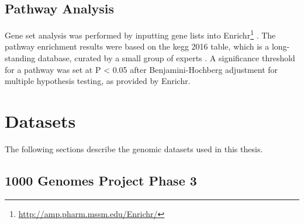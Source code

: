 \documentclass[twoside,openright]{report}
\newenvironment{Shaded}{\begin{snugshade}}{\end{snugshade}}
\newcommand{\KeywordTok}[1]{\textcolor[rgb]{0.13,0.29,0.53}{\textbf{#1}}}
\newcommand{\CommentTok}[1]{\textcolor[rgb]{0.56,0.35,0.01}{\textit{#1}}}
\newcommand{\FunctionTok}[1]{\textcolor[rgb]{0.00,0.00,0.00}{#1}}
\newcommand{\VariableTok}[1]{\textcolor[rgb]{0.00,0.00,0.00}{#1}}
\newcommand{\ExtensionTok}[1]{#1}
\newcommand{\NormalTok}[1]{#1}
\begin{document}
\begin{Shaded}
\end{Shaded}

\subsection{Pathway Analysis}\label{pathway-analysis-1}

Gene set analysis was performed by inputting gene lists into
Enrichr\footnote{\url{http://amp.pharm.mssm.edu/Enrichr/}}
\citep{Chen2013b, Kuleshov2016}. The pathway enrichment results were
based on the \gls{kegg} 2016 table, which is a long-standing database,
curated by a small group of experts \citep{Kanehisa2017}. A significance
threshold for a pathway was set at P \textless{} 0.05 after
Benjamini-Hochberg adjustment \citep{Benjamini1995} for multiple
hypothesis testing, as provided by Enrichr.

\section{Datasets}\label{datasets}

The following sections describe the genomic datasets used in this
thesis.

\subsection{1000 Genomes Project Phase 3}\label{kgpdesc}
\end{document}
